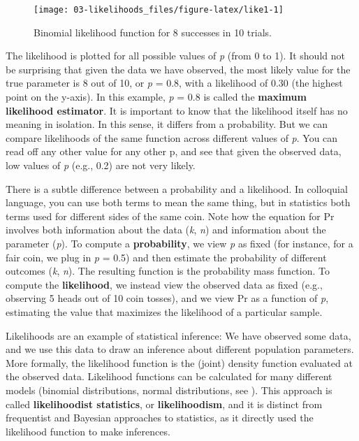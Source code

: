 \documentclass[
  oneside]{book}
\begin{document}
\begin{figure}

{\centering \texttt{[image: 03-likelihoods\_files/figure-latex/like1-1]} 

}

\caption{Binomial likelihood function for 8 successes in 10 trials.}\label{fig:like1}
\end{figure}

The likelihood is plotted for all possible values of \emph{p} (from 0 to 1). It should not be surprising that given the data we have observed, the most likely value for the true parameter is 8 out of 10, or \emph{p} = 0.8, with a likelihood of 0.30 (the highest point on the y-axis). In this example, \emph{p} = 0.8 is called the \textbf{maximum likelihood estimator}. It is important to know that the likelihood itself has no meaning in isolation. In this sense, it differs from a probability. But we can compare likelihoods of the same function across different values of \emph{p}. You can read off any other value for any other p, and see that given the observed data, low values of \emph{p} (e.g., 0.2) are not very likely.

There is a subtle difference between a probability and a likelihood. In colloquial language, you can use both terms to mean the same thing, but in statistics both terms used for different sides of the same coin. Note how the equation for Pr involves both information about the data (\emph{k}, \emph{n}) and information about the parameter (\emph{p}). To compute a \textbf{probability}, we view \emph{p} as fixed (for instance, for a fair coin, we plug in \emph{p} = 0.5) and then estimate the probability of different outcomes (\emph{k}, \emph{n}). The resulting function is the probability mass function. To compute the \textbf{likelihood}, we instead view the observed data as fixed (e.g., observing 5 heads out of 10 coin tosses), and we view Pr as a function of \emph{p}, estimating the value that maximizes the likelihood of a particular sample.

Likelihoods are an example of statistical inference: We have observed some data, and we use this data to draw an inference about different population parameters. More formally, the likelihood function is the (joint) density function evaluated at the observed data. Likelihood functions can be calculated for many different models (binomial distributions, normal distributions, see \citet{millar_maximum_2011}). This approach is called \textbf{likelihoodist statistics}, or \textbf{likelihoodism}, and it is distinct from frequentist and Bayesian approaches to statistics, as it directly used the likelihood function to make inferences.
\end{document}
